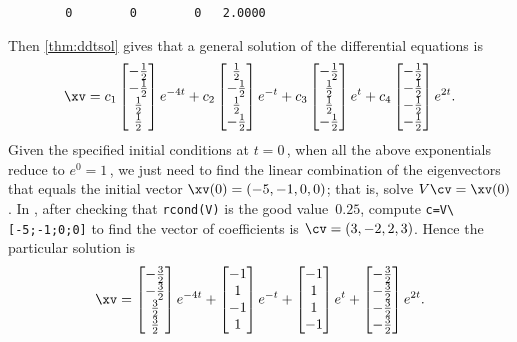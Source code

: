 \begin{example}
\begin{solution}
\begin{verbatim}
        0        0        0   2.0000
\end{verbatim}
Then \cref{thm:ddtsol} gives that a general solution of the differential equations is
\begin{equation*}
\xv=
c_1\begin{bmatrix} -\tfrac12\\-\tfrac12\\\tfrac12\\\tfrac12 \end{bmatrix}e^{-4t}
+c_2\begin{bmatrix} \tfrac12\\-\tfrac12\\\tfrac12\\-\tfrac12 \end{bmatrix}e^{-t}
+c_3\begin{bmatrix} -\tfrac12\\\tfrac12\\\tfrac12\\-\tfrac12 \end{bmatrix}e^{t}
+c_4\begin{bmatrix} -\tfrac12\\-\tfrac12\\-\tfrac12\\-\tfrac12 \end{bmatrix}e^{2t}.
\end{equation*}
Given the specified initial conditions at \(t=0\)\,, when all the above exponentials reduce to \(e^0=1\)\,, we just need to find the linear combination of the eigenvectors that equals the initial vector \(\xv(0)=(-5,-1,0,0)\); that is, solve \(V\cv=\xv(0)\).
In \script, after checking that \verb|rcond(V)| is the good value~\(0.25\), compute \verb|c=V\[-5;-1;0;0]| to find the vector of coefficients is \(\cv=(3,-2,2,3)\).
Hence the particular solution is
\begin{equation*}
\xv=
\begin{bmatrix} -\tfrac32\\-\tfrac32\\\tfrac32\\\tfrac32 \end{bmatrix}e^{-4t}
+\begin{bmatrix} -1\\1\\-1\\1 \end{bmatrix}e^{-t}
+\begin{bmatrix} -1\\1\\1\\-1 \end{bmatrix}e^{t}
+\begin{bmatrix} -\tfrac32\\-\tfrac32\\-\tfrac32\\-\tfrac32 \end{bmatrix}e^{2t}.
\end{equation*}
\end{solution}
\end{example}








